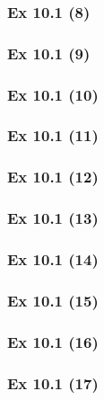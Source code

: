 \subsubsection{Ex 10.1 (8)}\label{sec:Ex_10.1.8}

\subsubsection{Ex 10.1 (9)}\label{sec:Ex_10.1.9}

\subsubsection{Ex 10.1 (10)}\label{sec:Ex_10.1.10}

\newpage		%

\subsubsection{Ex 10.1 (11)}\label{sec:Ex_10.1.11}

\subsubsection{Ex 10.1 (12)}\label{sec:Ex_10.1.12}

\subsubsection{Ex 10.1 (13)}\label{sec:Ex_10.1.13}

\subsubsection{Ex 10.1 (14)}\label{sec:Ex_10.1.14}

\subsubsection{Ex 10.1 (15)}\label{sec:Ex_10.1.15}

\subsubsection{Ex 10.1 (16)}\label{sec:Ex_10.1.16}

\subsubsection{Ex 10.1 (17)}\label{sec:Ex_10.1.17}

